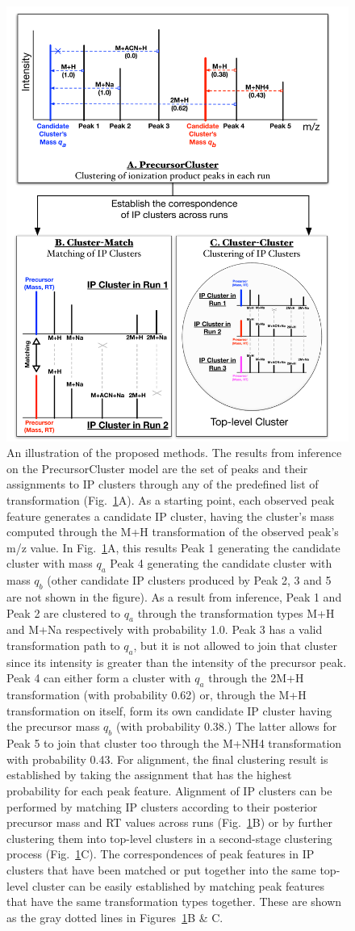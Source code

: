 \begin{figure}[!htbp]
\centering\includegraphics[width=0.7\linewidth]{06-precursor-cluster/figures/fig1.pdf}
\centering\caption{\label{fig:01} An illustration of the proposed methods. The results from inference on the PrecursorCluster model are the set of peaks and their assignments to IP clusters through any of the predefined list of transformation (Fig.~\ref{fig:01}A). As a starting point, each observed peak feature generates a candidate IP cluster, having the cluster's mass computed through the M+H transformation of the observed peak's m/z value. In Fig.~\ref{fig:01}A, this results Peak 1 generating the candidate cluster with mass $q_a$ Peak 4 generating the candidate cluster with mass $q_b$ (other candidate IP clusters produced by Peak 2, 3 and 5 are not shown in the figure). As a result from inference, Peak 1 and Peak 2 are clustered to $q_a$ through the transformation types M+H and M+Na respectively with probability 1.0. Peak 3 has a valid transformation path to $q_a$, but it is not allowed to join that cluster since its intensity is greater than the intensity of the precursor peak. Peak 4 can either form a cluster with $q_a$ through the 2M+H transformation (with probability 0.62) or, through the M+H transformation on itself, form its own candidate IP cluster having the precursor mass $q_b$ (with probability 0.38.) The latter allows for Peak 5 to join that cluster too through the M+NH4 transformation with probability 0.43. For alignment, the final clustering result is established by taking the assignment that has the highest probability for each peak feature. Alignment of IP clusters can be performed by matching IP clusters according to their posterior precursor mass and RT values across runs (Fig.~\ref{fig:01}B) or by further clustering them into top-level clusters in a second-stage clustering process (Fig.~\ref{fig:01}C). The correspondences of peak features in IP clusters that have been matched or put together into the same top-level cluster can be easily established by matching peak features that have the same transformation types together. These are shown as the gray dotted lines in Figures~\ref{fig:01}B \& C.}
\end{figure}


